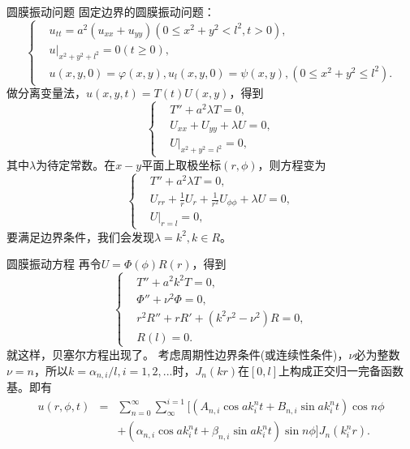 \documentclass[11pt]{beamer}
\begin{document}
\begin{frame}{圆膜振动问题}
固定边界的圆膜振动问题：
\begin{equation}
\left\{
\begin{aligned}
& u_{tt} = a^2( u_{xx} + u_{yy} ) ( 0 \leq x^2 + y^2 < l^2, t>0 ), \\
& u|_{x^2 + y^2 + l^2} = 0 ( t \geq 0), \\
& u(x,y,0) = \varphi(x,y), u_l(x,y,0) = \psi(x,y), ( 0 \leq x^2 + y^2 \leq l^2 ).
\end{aligned}
\right.
\end{equation}
做分离变量法，$u(x,y,t) = T(t) U(x,y)$，得到
\begin{equation}
\left\{
\begin{aligned}
& T'' + a^2 \lambda T = 0, \\
& U_{xx} + U_{yy} + \lambda U = 0, \\
& U|_{x^2 + y^2 = l^2} = 0,
\end{aligned}
\right.
\end{equation}
其中$\lambda$为待定常数。在$x-y$平面上取极坐标$(r,\phi)$，则方程变为
\begin{equation}
\left\{
\begin{aligned}
& T'' + a^2 \lambda T = 0, \\
& U_{rr} + \frac{1}{r}U_r + \frac{1}{r^2}U_{\phi \phi} + \lambda U = 0, \\
& U|_{r=l} = 0,
\end{aligned}
\right.
\end{equation}
要满足边界条件，我们会发现$\lambda = k^2, k \in R$。
\end{frame}

\begin{frame}{圆膜振动方程}
再令$U = \Phi(\phi) R(r)$，得到
\begin{equation}
\left\{
\begin{aligned}
& T'' + a^2 k^2 T = 0, \\
& \Phi'' + \nu^2 \Phi = 0, \\
& r^2 R'' + r R' + (k^2 r^2 - \nu^2 ) R = 0,\\
& R(l) = 0.
\end{aligned}
\right.
\end{equation}
就这样，贝塞尔方程出现了。
考虑周期性边界条件(或连续性条件)，$\nu$必为整数$\nu = n$，所以$k = \alpha_{n,i}/l, i=1,2,...$时，$J_n(kr)$在$[0,l]$上构成正交归一完备函数基。即有
\begin{eqnarray}
u(r,\phi, t) &=& \sum^\infty_{n=0} \sum_{\infty}^{i=1}
[ ( A_{n,i} \cos a k^n_i t + B_{n,i} \sin a k^n_i t ) \cos n \phi 
\nonumber\\
&& + ( \alpha_{n,i} \cos a k^n_i t + \beta_{n,i} \sin a k^n_i t ) \sin n \phi ] J_n (k^n_i r).
\end{eqnarray}
\end{frame}
\end{document}
